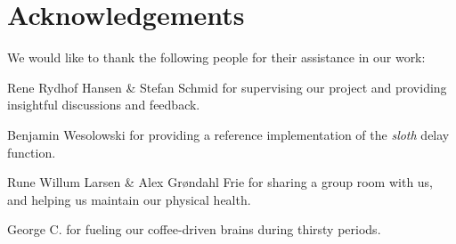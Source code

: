 \section{Acknowledgements}
We would like to thank the following people for their assistance in our work:


Rene Rydhof Hansen \& Stefan Schmid for supervising our project and providing insightful discussions and feedback.

Benjamin Wesolowski for providing a reference implementation of the \emph{sloth} delay function.

Rune Willum Larsen \& Alex Grøndahl Frie for sharing a group room with us, and helping us maintain our physical health.

George C. for fueling our coffee-driven brains during thirsty periods.


